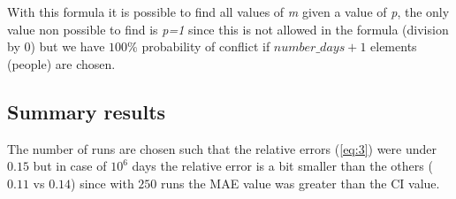 \documentclass[twocolumn,letterpaper]{report}
\begin{document}
{		With this formula it is possible to find all values of \emph{m} given a value of \emph{p}, the only value non possible to find is \emph{p=1} since this is not allowed in the formula (division by 0) but we have $100\%$ probability of conflict if $number\_days+1$ elements (people) are chosen.
		
		\subsection{Summary results}
				\begin{table}[h]
				\renewcommand{\arraystretch}{1.05}
				\end{table}
			The number of runs are chosen such that the relative errors (\ref{eq:3}) were under $0.15$ but in case of $10^6$ days the relative error is a bit smaller than the others ($0.11$ vs $0.14$) since with $250$ runs the MAE value was greater than the CI value.
} \fi
			
\end{document}
